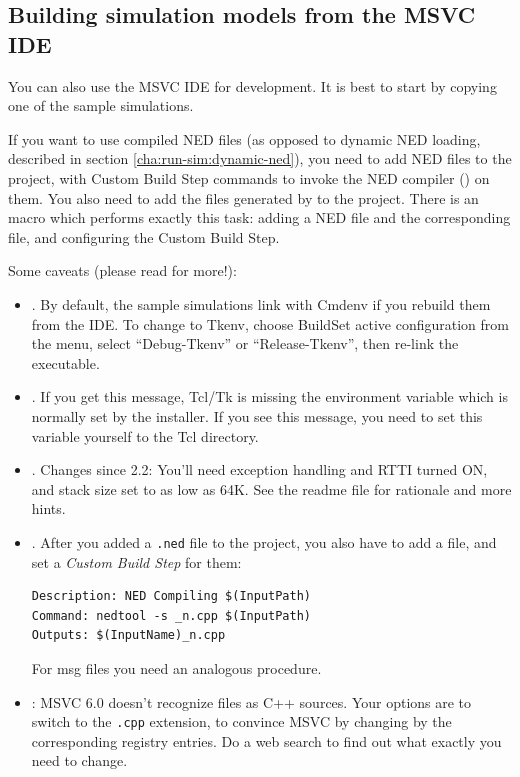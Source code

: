 \subsection{Building simulation models from the MSVC IDE}

You can also use the MSVC IDE for development.
It is best to start by copying one of the sample simulations.

If you want to use compiled NED files (as opposed to dynamic
NED loading, described in section \ref{cha:run-sim:dynamic-ned}),
you need to add NED files to the project, with Custom Build Step
commands to invoke the NED compiler () on them.
You also need to add the  files generated by 
to the project. There is an 
macro which performs exactly this task: adding a NED file and
the corresponding  file, and configuring
the Custom Build Step.


Some caveats (please read  for more!):

\begin{itemize}
 \item {}. By default,
   the sample simulations link with Cmdenv if you rebuild them
   from the IDE. To change to Tkenv, choose Build{\textbar}Set
   active configuration from the menu, select ``Debug-Tkenv''
   or ``Release-Tkenv'', then re-link the executable.

 \item {}. If you get this message,
   Tcl/Tk is missing the  environment variable
   which is normally set by the installer. If you see this message,
   you need to set this variable yourself to the Tcl  directory.

 \item {}. Changes since {\opp} 2.2:
   You'll need exception handling and RTTI turned ON, and
   stack size set to as low as 64K.
   See the readme file for rationale and more hints.

 \item {}. After you added a \texttt{.ned} file
   to the project, you also have to add a  file, and set a
   \textit{Custom Build Step} for them:

\begin{verbatim}
Description: NED Compiling $(InputPath)
Command: nedtool -s _n.cpp $(InputPath)
Outputs: $(InputName)_n.cpp
\end{verbatim}

   For msg files you need an analogous procedure.

 \item {}: MSVC 6.0 doesn't recognize  files
   as C++ sources. Your options are to switch to the \texttt{.cpp} extension,
   to convince MSVC by changing by the corresponding registry entries.
   Do a web search to find out what exactly you need to change.

\end{itemize}



